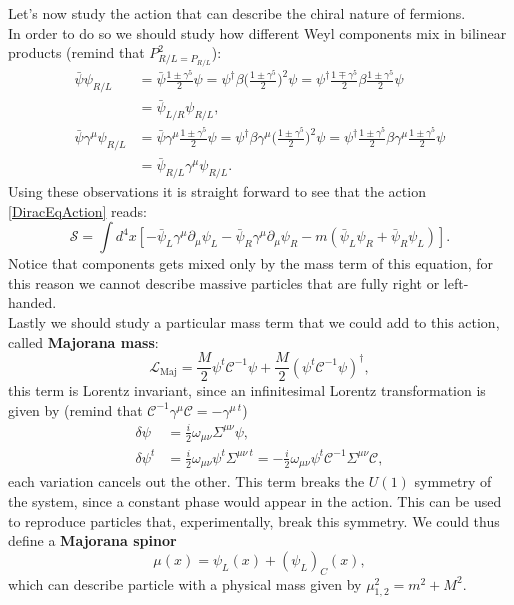 Let's now study the action that can describe the chiral nature of fermions. \\
In order to do so we should study how different Weyl components mix in bilinear products (remind that $P^2_{R/L=P_{R/L}}$):
\begin{align*}
    \bar\psi\psi_{R/L}&=\bar\psi\frac{1\pm\gamma^5}{2}\psi=\psi^\dagger\beta\bigg(\frac{1\pm\gamma^5}{2}\bigg)^2\psi=\psi^\dagger\frac{1\mp\gamma^5}{2}\beta\frac{1\pm\gamma^5}{2}\psi\\&=\bar\psi_{L/R}\psi_{R/L},\\
    \bar\psi\gamma^\mu\psi_{R/L}&=\bar\psi\gamma^\mu\frac{1\pm\gamma^5}{2}\psi=\psi^\dagger\beta\gamma^\mu\bigg(\frac{1\pm\gamma^5}{2}\bigg)^2\psi=\psi^\dagger\frac{1\pm\gamma^5}{2}\beta\gamma^\mu\frac{1\pm\gamma^5}{2}\psi\\&=\bar\psi_{R/L}\gamma^\mu\psi_{R/L}.
\end{align*}
Using these observations it is straight forward to see that the action \eqref{DiracEqAction} reads:
\begin{equation}
    \label{DiracEqActionWeyl} \mathcal{S}=\int d^4x[-\bar\psi_{L}\gamma^\mu\partial_\mu\psi_{L}-\bar\psi_{R}\gamma^\mu\partial_\mu\psi_{R}-m(\bar\psi_{L}\psi_{R}+\bar\psi_{R}\psi_{L})].
\end{equation}
Notice that components gets mixed only by the mass term of this equation, for this reason we cannot describe massive particles that are fully right or left-handed.\\

Lastly we should study a particular mass term that we could add to this action, called \textbf{Majorana mass}:
\begin{equation}\label{MajoranaMassLagr}
    \mathcal{L}_{\text{Maj}}=\frac{M}{2}\psi^t\mathcal{C} ^{-1}\psi+\frac{M}{2}(\psi^t \mathcal{C} ^{-1}\psi)^\dagger,
\end{equation}
this term is Lorentz invariant, since an infinitesimal Lorentz transformation is given by (remind that $\mathcal{C} ^{-1}\gamma^\mu\mathcal{C} =-\gamma^{\mu\ t}$)
\begin{align*}
    \delta\psi&=\frac{i}{2}\omega_{\mu\nu}\Sigma^{\mu\nu}\psi,\\
    \delta\psi^t&=\frac{i}{2}\omega_{\mu\nu}\psi^t\Sigma^{\mu\nu\ t}=-\frac{i}{2}\omega_{\mu\nu}\psi^t\mathcal{C}^{-1}\Sigma^{\mu\nu}\mathcal{C},
\end{align*}
each variation cancels out the other. This term breaks the $U(1)$ symmetry of the system, since a constant phase would appear in the action. This can be used to reproduce particles that, experimentally, break this symmetry. We could thus define a \textbf{Majorana spinor}
\begin{equation*}
    \mu(x)=\psi_L(x)+(\psi_L)_C(x),
\end{equation*}
which can describe particle with a physical mass given by $\mu^2_{1,2}=m^2+M^2$.







